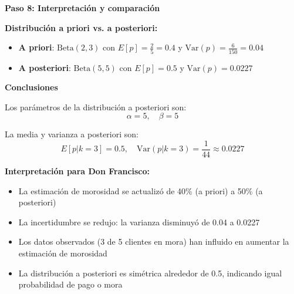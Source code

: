 \documentclass[11pt,a4paper]{article}
\begin{document}
\textbf{Paso 8: Interpretación y comparación}

\textbf{Distribución a priori vs. a posteriori:}
\begin{itemize}
    \item \textbf{A priori}: $\text{Beta}(2, 3)$ con $E[p] = \frac{2}{5} = 0.4$ y $\text{Var}(p) = \frac{6}{150} = 0.04$
    \item \textbf{A posteriori}: $\text{Beta}(5, 5)$ con $E[p] = 0.5$ y $\text{Var}(p) = 0.0227$
\end{itemize}

\textbf{Conclusiones}

Los parámetros de la distribución a posteriori son:
\[
\boxed{\alpha = 5, \quad \beta = 5}
\]

La media y varianza a posteriori son:
\[
\boxed{E[p|k = 3] = 0.5, \quad \text{Var}(p|k = 3) = \frac{1}{44} \approx 0.0227}
\]

\textbf{Interpretación para Don Francisco:}
\begin{itemize}
    \item La estimación de morosidad se actualizó de 40\% (a priori) a 50\% (a posteriori)
    \item La incertidumbre se redujo: la varianza disminuyó de 0.04 a 0.0227
    \item Los datos observados (3 de 5 clientes en mora) han influido en aumentar la estimación de morosidad
    \item La distribución a posteriori es simétrica alrededor de 0.5, indicando igual probabilidad de pago o mora
\end{itemize}
\end{document}
